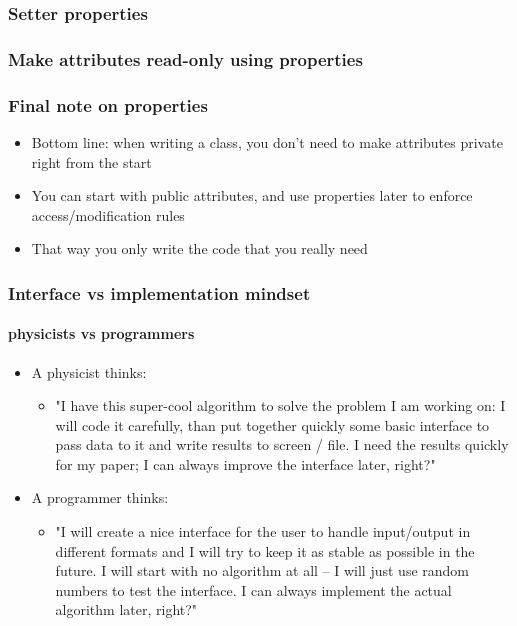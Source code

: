 \documentclass[9pt]{beamer}
\begin{document}
\begin{frame}
  \frametitle{Setter properties}
  
\end{frame}

\begin{frame}
  \frametitle{Make attributes read-only using properties}
  
\end{frame}

\begin{frame}
\frametitle{Final note on properties}
  \begin{itemize}
    \item Bottom line: when writing a class, you don't need to make attributes
          private right from the start
    \medskip
    \item You can start with public attributes, and use properties later to
          enforce access/modification rules
    \medskip
    \item That way you only write the code that you really need
  \end{itemize}
\end{frame}

\begin{frame}
  \frametitle{Interface vs implementation mindset}
  \framesubtitle{physicists vs programmers}

  \begin{itemize}

    \item A physicist thinks:

    \medskip

    \begin{itemize}
      \item "I have this super-cool algorithm to solve the problem I am working on:
             I will code it carefully, than put together quickly some basic
             interface to pass data to it and write results to screen / file.
             I need the results quickly for my paper; I can always improve the
             interface later, right?"
    \end{itemize}
    \medskip

    \item A programmer thinks:

    \medskip

    \begin{itemize}
      \item "I will create a nice interface for the user to handle input/output
             in different formats and I will try to keep it as stable as
             possible in the future.
             I will start with no algorithm at all -- I will just use random
             numbers to test the interface. I can always implement the
             actual algorithm later, right?"
    \end{itemize}

  \end{itemize}

\end{frame}
\end{document}
